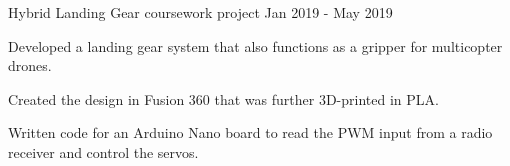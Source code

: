 \begin{project}
  {Hybrid Landing Gear}
  {coursework project}
  {Jan 2019 - May 2019}
  {}

  \item Developed a landing gear system that also functions as a gripper for
        multicopter drones.

  \item Created the design in Fusion 360 that was further 3D-printed in PLA.

  \item Written code for an Arduino Nano board to read the PWM input from a
        radio receiver and control the servos.

\end{project}
